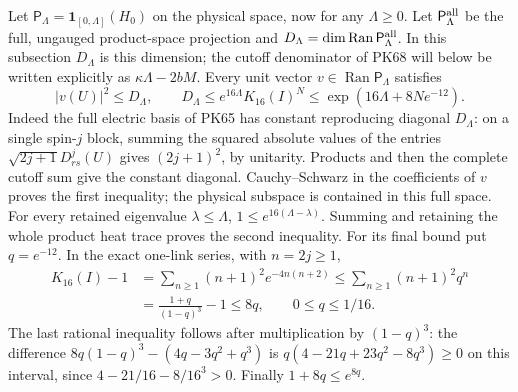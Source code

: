 \documentclass[11pt]{article}
\begin{document}
Let \(\mathsf P_\Lambda=\mathbf1_{[0,\Lambda]}(H_0)\) on the
physical space, now for any \(\Lambda\ge0\). Let
\(\mathsf P_\Lambda^{\rm all}\) be the full, ungauged product-space
projection and \(D_\Lambda=\dim\operatorname{Ran}
\mathsf P_\Lambda^{\rm all}\). In this subsection \(D_\Lambda\)
is this dimension; the cutoff denominator of PK68 will below be
written explicitly as \(\kappa\Lambda-2bM\). Every unit vector
\(v\in\operatorname{Ran}\mathsf P_\Lambda\) satisfies
\[
 |v(U)|^2\le D_\Lambda,\qquad
 D_\Lambda\le e^{16\Lambda}K_{16}(I)^N
       \le\exp\!\left(16\Lambda+8Ne^{-12}\right).
 \tag{PK208}
\]
Indeed the full electric basis of PK65 has constant reproducing
diagonal \(D_\Lambda\): on a single spin-\(j\) block, summing the
squared absolute values of the entries
\(\sqrt{2j+1}D^j_{rs}(U)\) gives \((2j+1)^2\), by unitarity.
Products and then the complete cutoff sum give the constant
diagonal. Cauchy--Schwarz in the coefficients of \(v\) proves the
first inequality; the physical subspace is contained in this full
space. For every retained eigenvalue \(\lambda\le\Lambda\),
\(1\le e^{16(\Lambda-\lambda)}\). Summing and retaining the
whole product heat trace proves the second inequality.
For its final bound put \(q=e^{-12}\). In the exact one-link
series, with \(n=2j\ge1\),
\[
 \begin{split}
 K_{16}(I)-1
 &=\sum_{n\ge1}(n+1)^2e^{-4n(n+2)}
 \le\sum_{n\ge1}(n+1)^2q^n\\
 &=\frac{1+q}{(1-q)^3}-1\le8q,\qquad 0\le q\le1/16.
 \end{split}
\]
The last rational inequality follows after multiplication by
\((1-q)^3\): the difference \(8q(1-q)^3-(4q-3q^2+q^3)\)
is \(q(4-21q+23q^2-8q^3)\ge0\) on this interval, since
\(4-21/16-8/16^3>0\). Finally \(1+8q\le e^{8q}\).
\end{document}
